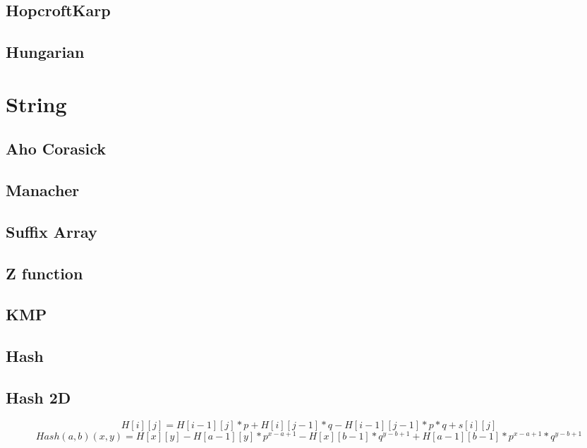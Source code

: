 \documentclass[A4 paper, 12pt, oneside, landscape]{article}
\begin{document}
\begin{multicols}{2}
	\subsection{HopcroftKarp}
	
	
	\subsection{Hungarian}
	
	
\section{String}
	\subsection{Aho Corasick}
	
	
	\subsection{Manacher}
	
	
	\subsection{Suffix Array}
	
	
	\subsection{Z function}
	
	
	\subsection{KMP}
	
	
	\subsection{Hash}
	
	
	\subsection{Hash 2D}
	\begin{dmath}
	H[i][j] = H[i - 1][j] * p + H[i][j - 1] * q - H[i - 1][j - 1] * p * q + s[i][j]
	\end{dmath}
	\begin{dmath}
	Hash(a,b)(x,y) = H[x][y] - H[a - 1][y]*p^{x - a + 1} - H[x][b - 1]*q^{y - b + 1} + H[a - 1][b - 1] * p^{x - a + 1} * q^{y - b + 1}
	\end{dmath}


\end{multicols}
\end{document}
